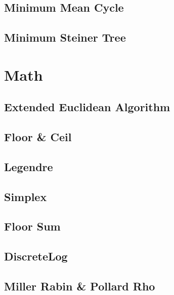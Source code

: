 \documentclass[a4paper,10pt,oneside]{article}
\begin{document}
\subsection{Minimum Mean Cycle}


\subsection{Minimum Steiner Tree}


\section{Math}

\subsection{Extended Euclidean Algorithm}


\subsection{Floor \& Ceil}


\subsection{Legendre}


\subsection{Simplex}


\subsection{Floor Sum}


\subsection{DiscreteLog}


\subsection{Miller Rabin \& Pollard Rho}

\end{document}
